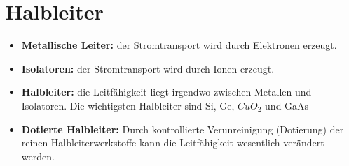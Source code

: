 \renewcommand{\arraystretch}{0.6}
\section{Halbleiter}
\begin{itemize}
    \item \textbf{Metallische Leiter:} der Stromtransport wird durch Elektronen erzeugt.
    \item \textbf{Isolatoren:} der Stromtransport wird durch Ionen erzeugt.
    \item \textbf{Halbleiter:} die Leitfähigkeit liegt irgendwo zwischen Metallen und Isolatoren.
    \subitem  Die wichtigsten Halbleiter sind  Si, Ge, $CuO_2$ und GaAs 
    \item \textbf{Dotierte Halbleiter:} Durch kontrollierte Verunreinigung (Dotierung) der reinen Halbleiterwerkstoffe kann die Leitfähigkeit wesentlich verändert werden.
\end{itemize}
